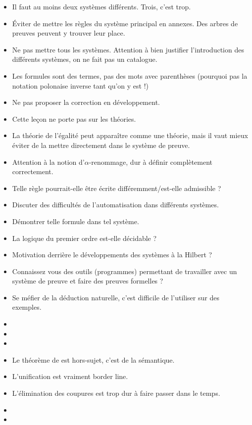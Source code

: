 \documentclass{agregfiche}
\begin{document}
\begin{itemize}
    \item Il faut au moins deux systèmes différents. Trois, c'est trop.
	\item Éviter de mettre les règles du système principal en annexes. Des arbres de preuves peuvent y trouver leur place.
	\item Ne pas mettre tous les systèmes. Attention à bien justifier l'introduction des différents systèmes, on ne fait pas un catalogue.
    \item Les formules sont des termes, pas des mots avec parenthèses (pourquoi pas la notation polonaise inverse tant qu'on y est !)
    \item Ne pas proposer la correction en développement.
	\item Cette leçon ne porte pas sur les théories.
    \item La théorie de l'égalité peut apparaître comme une théorie, mais il vaut mieux éviter de la mettre directement dans le système de preuve.
    \item Attention à la notion d'$\alpha$-renommage, dur à définir complètement correctement.
\end{itemize}

\secquestionsclassiques

\begin{itemize}
    \item Telle règle pourrait-elle être écrite différemment/est-elle admissible ?
	\item Discuter des difficultés de l'automatisation dans différents systèmes.
	\item Démontrer telle formule dans tel système.
	\item La logique du premier ordre est-elle décidable ?
	\item Motivation derrière le développements des systèmes à la Hilbert ?
	\item Connaissez vous des outils (programmes) permettant de travailler avec un système de preuve et faire des preuves formelles ?
    \item Se méfier de la déduction naturelle, c'est difficile de l'utiliser sur des exemples.
\end{itemize}

\secreferences

\begin{itemize}
\item 
\item 
\item 



\end{itemize}

\secdev

\begin{itemize}
\item Le théorème de  est hors-sujet, c'est de la sémantique.
\item L'unification est vraiment border line.
\item L'élimination des coupures est trop dur à faire passer dans le temps.
\item 
\item 
\end{itemize}
\end{document}
